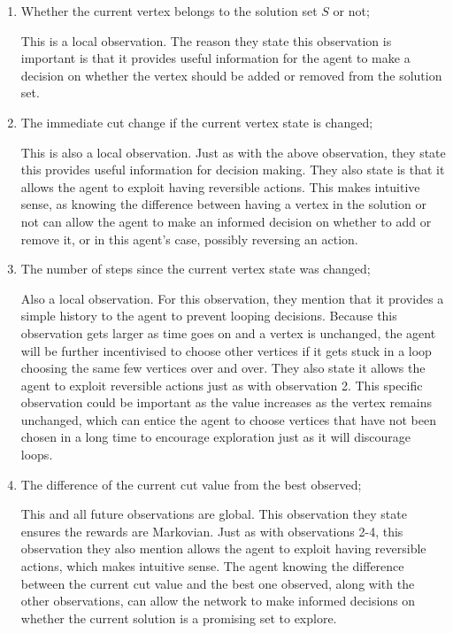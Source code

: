 \documentclass{article}
\begin{document}
\begin{enumerate}
    \item Whether the current vertex belongs to the solution set $S$ or not; 
    
    This is a local observation. The reason they state this observation is important is that it provides useful information for the agent to make a decision on whether the vertex should be added or removed from the solution set.

    \item The immediate cut change if the current vertex state is changed;
    
    This is also a local observation. Just as with the above observation, they state this provides useful information for decision making. They also state is that it allows the agent to exploit having reversible actions. This makes intuitive sense, as knowing the difference between having a vertex in the solution or not can allow the agent to make an informed decision on whether to add or remove it, or in this agent's case, possibly reversing an action. 

    \item The number of steps since the current vertex state was changed;
    
    Also a local observation. For this observation, they mention that it provides a simple history to the agent to prevent looping decisions. Because this observation gets larger as time goes on and a vertex is unchanged, the agent will be further incentivised to choose other vertices if it gets stuck in a loop choosing the same few vertices over and over. They also state it allows the agent to exploit reversible actions just as with observation 2. This specific observation could be important as the value increases as the vertex remains unchanged, which can entice the agent to choose vertices that have not been chosen in a long time to encourage exploration just as it will discourage loops.
    
    \item The difference of the current cut value from the best observed;
    
    This and all future observations are global. This observation they state ensures the rewards are Markovian. Just as with observations 2-4, this observation they also mention allows the agent to exploit having reversible actions, which makes intuitive sense. The agent knowing the difference between the current cut value and the best one observed, along with the other observations, can allow the network to make informed decisions on whether the current solution is a promising set to explore.


\end{enumerate}
\end{document}
